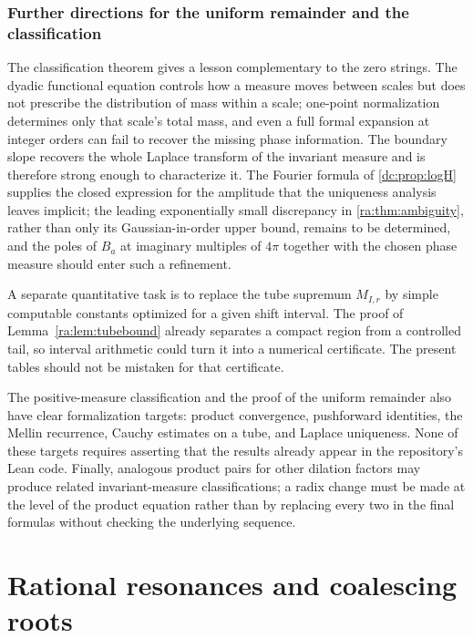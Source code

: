 \documentclass[11pt,a4paper,oneside,openany]{book}
\numberwithin{equation}{chapter}
\theoremstyle{definition}
\theoremstyle{remark}
\begin{document}
\section{Further directions for the uniform remainder and the classification}
The classification theorem gives a lesson complementary to the zero
strings. The dyadic functional equation controls how a measure moves between
scales but does not prescribe the distribution of mass within a scale;
one-point normalization determines only that scale's total mass, and even a
full formal expansion at integer orders can fail to recover the missing
phase information. The boundary slope recovers the whole Laplace transform
of the invariant measure and is therefore strong enough to characterize it.
The Fourier formula of \cref{dc:prop:logH} supplies the closed expression for
the amplitude that the uniqueness analysis leaves implicit; the leading
exponentially small discrepancy in \cref{ra:thm:ambiguity}, rather than only
its Gaussian-in-order upper bound, remains to be determined, and the poles
of $B_a$ at imaginary multiples of $4\pi$ together with the chosen phase
measure should enter such a refinement.

A separate quantitative task is to replace the tube supremum $M_{I,r}$ by
simple computable constants optimized for a given shift interval.
The proof of Lemma~\ref{ra:lem:tubebound} already separates a compact region
from a controlled tail, so interval arithmetic could turn it into a
numerical certificate. The present tables should not be mistaken for that
certificate.

The positive-measure classification and the proof of the uniform remainder
also have clear formalization targets: product convergence, pushforward
identities, the Mellin recurrence, Cauchy estimates on a tube, and Laplace
uniqueness. None of these targets requires asserting that the results
already appear in the repository's Lean code. Finally, analogous product
pairs for other dilation factors may produce related invariant-measure
classifications; a radix change must be made at the level of the product
equation rather than by replacing every two in the final formulas without
checking the underlying sequence.

\part{Rational resonances and coalescing roots}
\label{part:resonances}
\end{document}
